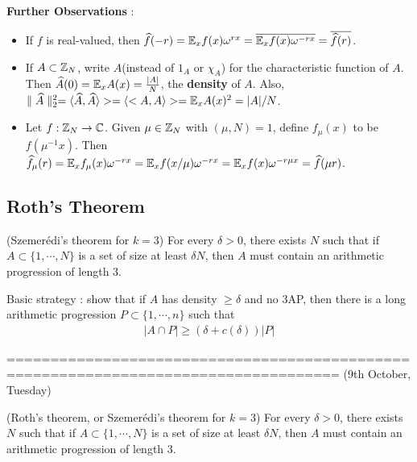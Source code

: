 \documentclass[10pt,a4paper]{report}
\renewcommand{\hat}{\widehat}
\begin{document}
\textbf{Further Observations} :

\begin{itemize}
\item If $f$ is real-valued, then $\hat{f}(-r) = \avg_x f(x) \omega^{rx} = \bar{\avg_x f(x) \omega^{-rx}} = \overline{ \hat{f}(r) }$.

\item If $A\subset \mathbb{Z}_N$, write $A$(instead of $1_A$ or $\chi_A$) for the characteristic function of $A$. Then $\hat{A}(0) = \avg_x A(x) = \frac{|A|}{N}$, the \textbf{density} of $A$. Also, $\norms{\hat{A}}{2}^2 = \langle \hat{A}, \hat{A} \rangle> = \langle< A,A \rangle> = \avg_x A(x)^2 = |A|/N$.

\item Let $f: \mathbb{Z}_N \rightarrow \mathbb{C}$. Given $\mu \in \mathbb{Z}_N$ with $(\mu, N)=1$, define $f_{\mu}(x)$ to be $f(\mu^{-1}x)$. Then $\hat{f}_{\mu}(r) = \avg_x f_{\mu}(x)\omega^{-rx} = \avg_x f(x/\mu) \omega^{-rx} = \avg_x f(x)\omega^{-r\mu x} = \hat{f}(\mu r)$.
\end{itemize}

\subsection*{Roth's Theorem}
\s

(Szemer\'{e}di's theorem for $k=3$) For every $\delta >0$, there exists $N$ such that if $A \subset \{1, \cdots, N\}$ is a set of size at least $\delta N$, then $A$ must contain an arithmetic progression of length 3. 

\s

Basic strategy : show that if $A$ has density $\geq \delta$ and no 3AP, then there is a long arithmetic progression $P \subset \{1,\cdots,n\}$ such that
\begin{align*}
|A\cap P| \geq (\delta + c(\delta)) |P|
\end{align*}

====================================================================================
(9th October, Tuesday)
\s

(Roth's theorem, or Szemer\'{e}di's theorem for $k=3$) For every $\delta >0$, there exists $N$ such that if $A \subset \{1, \cdots, N\}$ is a set of size at least $\delta N$, then $A$ must contain an arithmetic progression of length 3. 
\s
\end{document}
